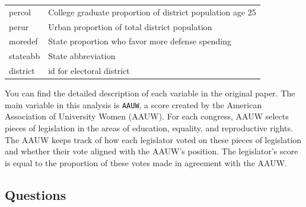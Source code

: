 \documentclass[]{book}
\begin{document}
\begin{longtable}[]{@{}ll@{}}
\begin{minipage}[t]{0.17\columnwidth}\raggedright\strut
percol\strut
\end{minipage} & \begin{minipage}[t]{0.67\columnwidth}\raggedright\strut
College graduate proportion of district population age 25\strut
\end{minipage}\tabularnewline
\begin{minipage}[t]{0.17\columnwidth}\raggedright\strut
perur\strut
\end{minipage} & \begin{minipage}[t]{0.67\columnwidth}\raggedright\strut
Urban proportion of total district population\strut
\end{minipage}\tabularnewline
\begin{minipage}[t]{0.17\columnwidth}\raggedright\strut
moredef\strut
\end{minipage} & \begin{minipage}[t]{0.67\columnwidth}\raggedright\strut
State proportion who favor more defense spending\strut
\end{minipage}\tabularnewline
\begin{minipage}[t]{0.17\columnwidth}\raggedright\strut
stateabb\strut
\end{minipage} & \begin{minipage}[t]{0.67\columnwidth}\raggedright\strut
State abbreviation\strut
\end{minipage}\tabularnewline
\begin{minipage}[t]{0.17\columnwidth}\raggedright\strut
district\strut
\end{minipage} & \begin{minipage}[t]{0.67\columnwidth}\raggedright\strut
id for electoral district\strut
\end{minipage}\tabularnewline
\bottomrule
\end{longtable}

You can find the detailed description of each variable in the original
paper. The main variable in this analysis is \texttt{AAUW}, a score
created by the American Association of University Women (AAUW). For each
congress, AAUW selects pieces of legislation in the areas of education,
equality, and reproductive rights. The AAUW keeps track of how each
legislator voted on these pieces of legislation and whether their vote
aligned with the AAUW's position. The legislator's score is equal to the
proportion of these votes made in agreement with the AAUW.

\subsection{Questions}\label{questions}
\end{document}
